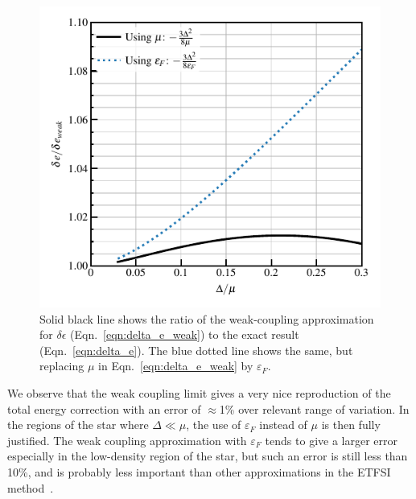 \documentclass[
    amsmath,amssymb,
    aps,
    prc,
    floatfix,
]{revtex4-2}
\begin{document}
\begin{appendix}
    \begin{figure}\label{fig:weak_coupling}
        \centering
        \includegraphics{figs/weak-coupling_accuracy.pdf}
        \caption{Solid black line shows the ratio of the weak-coupling approximation for $\delta\epsilon$ (Eqn.~\ref{eqn:delta_e_weak}) to the exact result (Eqn.~\ref{eqn:delta_e}). The blue dotted line shows the same, but replacing $\mu$ in Eqn.~\ref{eqn:delta_e_weak} by $\varepsilon_F$.}
        \label{fig:LDA_accuracy}
    \end{figure}
\noindent We observe that the weak coupling limit gives a very nice reproduction of the total energy correction with an error of $\approx$1\% over relevant range of variation.
In the regions of the star where $\Delta\ll\mu$, the use of $\varepsilon_F$ instead of $\mu$ is then fully justified. The weak coupling approximation with $\varepsilon_F$ tends to give a larger error especially in the low-density region of the star, but such an error is still less than 10\%, and is probably less important than other approximations in the ETFSI method~\cite{carreau2019bayesian}.
\end{appendix}



\end{document}
